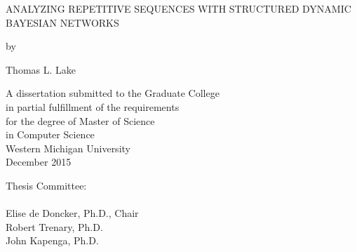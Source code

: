 \thispagestyle{empty}
\begin{center}
    \vspace{1.75in}
    ANALYZING REPETITIVE SEQUENCES WITH STRUCTURED DYNAMIC BAYESIAN NETWORKS

    \vspace{6\baselineskip}
    by

    \vspace{\baselineskip}
    Thomas L. Lake

    \vfill

    A dissertation submitted to the Graduate College\\
    in partial fulfillment of the requirements\\
    for the degree of Master of Science\\
    in Computer Science\\
    Western Michigan University\\
    December 2015
\end{center}
\vspace{10\baselineskip}
Thesis Committee:
\\\\
\hspace*{0.5in} Elise de Doncker, Ph.D., Chair\\
\hspace*{0.5in} Robert Trenary, Ph.D.\\
\hspace*{0.5in} John Kapenga, Ph.D.
\newpage
\restoregeometry
